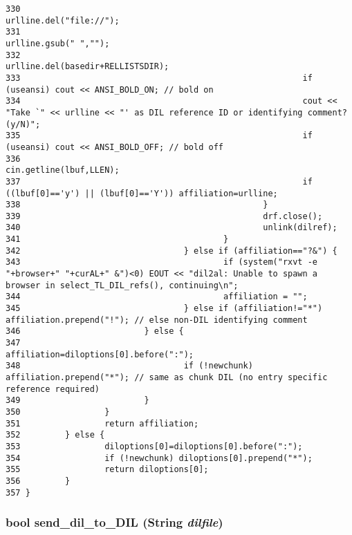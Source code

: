 \begin{verbatim}
330                                                         urlline.del("file://");
331                                                         urlline.gsub(" ","");
332                                                         urlline.del(basedir+RELLISTSDIR);
333                                                         if (useansi) cout << ANSI_BOLD_ON; // bold on
334                                                         cout << "Take `" << urlline << "' as DIL reference ID or identifying comment? (y/N)";
335                                                         if (useansi) cout << ANSI_BOLD_OFF; // bold off
336                                                         cin.getline(lbuf,LLEN);
337                                                         if ((lbuf[0]=='y') || (lbuf[0]=='Y')) affiliation=urlline;
338                                                 }
339                                                 drf.close();
340                                                 unlink(dilref);
341                                         }
342                                 } else if (affiliation=="?&") {
343                                         if (system("rxvt -e "+browser+" "+curAL+" &")<0) EOUT << "dil2al: Unable to spawn a browser in select_TL_DIL_refs(), continuing\n";
344                                         affiliation = "";
345                                 } else if (affiliation!="*") affiliation.prepend("!"); // else non-DIL identifying comment
346                         } else {
347                                 affiliation=diloptions[0].before(":");
348                                 if (!newchunk) affiliation.prepend("*"); // same as chunk DIL (no entry specific reference required)
349                         }
350                 }
351                 return affiliation;
352         } else {
353                 diloptions[0]=diloptions[0].before(":");
354                 if (!newchunk) diloptions[0].prepend("*");
355                 return diloptions[0];
356         }
357 }
\end{verbatim}\normalsize 
{}
\subsubsection{\setlength{\rightskip}{0pt plus 5cm}bool send\_\-dil\_\-to\_\-DIL ({\bf String} {\em dilfile})}\label{dil2al_8hh_a300}




